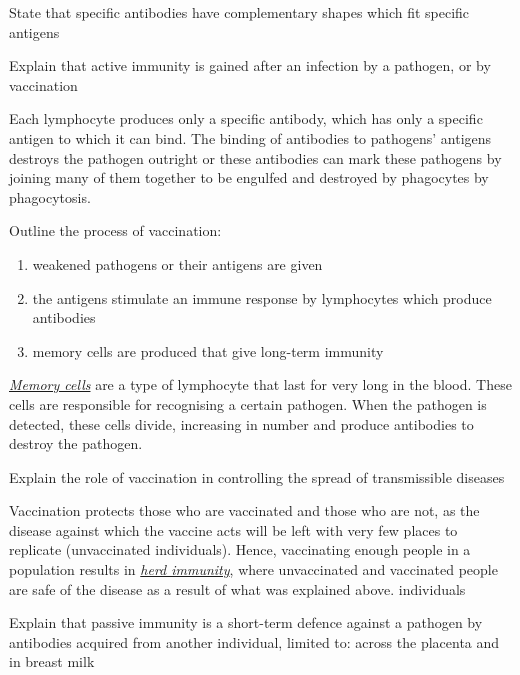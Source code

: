 \begin{point}
State that specific antibodies have complementary shapes which fit specific antigens
\end{point}

\begin{point}
Explain that active immunity is gained after an infection by a pathogen, or by vaccination
\end{point}

Each lymphocyte produces only a specific antibody, which has only a specific antigen to which it
can bind. The binding of antibodies to pathogens' antigens destroys the pathogen outright or
these antibodies can mark these pathogens by joining many of them together to be engulfed and
destroyed by phagocytes by phagocytosis.

\begin{point}
Outline the process of vaccination: 
\begin{enumerate}
	\setlength\itemsep{0em}
	\item weakened pathogens or their antigens are given
	\item the antigens stimulate an immune response by lymphocytes which produce antibodies
	\item memory cells are produced that give long-term immunity
\end{enumerate}
\end{point}

\underline{\emph{Memory cells}} are a type of lymphocyte that last for very long in the blood.
These cells are responsible for recognising a certain pathogen. When the pathogen is detected,
these cells divide, increasing in number and produce antibodies to destroy the pathogen.

\begin{point}
Explain the role of vaccination in controlling the spread of transmissible diseases
\end{point}

Vaccination protects those who are vaccinated and those who are not, as the disease against which
the vaccine acts will be left with very few places to replicate (unvaccinated individuals). Hence, 
vaccinating enough people in a population results in \underline{\emph{herd immunity}}, where
unvaccinated and vaccinated people are safe of the disease as a result of what was explained
above.
individuals

\begin{point}
Explain that passive immunity is a short-term defence against a pathogen by antibodies acquired from 
another individual, limited to: across the placenta and in breast milk
\end{point}

